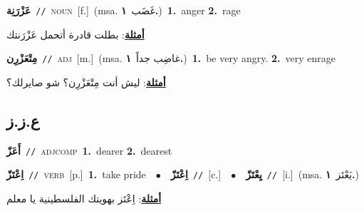 \documentclass[10pt,a4paper,twoside]{article} %
\begin{document}
\begin{multicols}{2}
{\setlength\topsep{0pt}\textbf{\foreignlanguage{arabic}{عَزْرَنِة}}\ {\color{gray}\texttt{//}\color{black}}\ \textsc{noun}\ [f.]\ \color{gray}(msa. \foreignlanguage{arabic}{غَضَب}~\foreignlanguage{arabic}{\textbf{١.}})\color{black}\ \textbf{1.}~anger  \textbf{2.}~rage\  \begin{flushright}\color{gray}\foreignlanguage{arabic}{\textbf{\underline{\foreignlanguage{arabic}{أمثلة}}}: بطلت قادرة أتحمل عَزْرَنتك}\end{flushright}\color{black}} \vspace{2mm}

{\setlength\topsep{0pt}\textbf{\foreignlanguage{arabic}{مِتْعَزْرِن}}\ {\color{gray}\texttt{//}\color{black}}\ \textsc{adj}\ [m.]\ \color{gray}(msa. \foreignlanguage{arabic}{غاضِب جداً}~\foreignlanguage{arabic}{\textbf{١.}})\color{black}\ \textbf{1.}~be very angry.  \textbf{2.}~very enrage\  \begin{flushright}\color{gray}\foreignlanguage{arabic}{\textbf{\underline{\foreignlanguage{arabic}{أمثلة}}}: ليش أنت مِتْعَزْرِن؟ شو صايرلك؟}\end{flushright}\color{black}} \vspace{2mm}

\vspace{-3mm}
\subsection*{\color{blue}\foreignlanguage{arabic}{ع.ز.ز}\color{blue}{}} 

{\setlength\topsep{0pt}\textbf{\foreignlanguage{arabic}{أَعَزّ}}\ {\color{gray}\texttt{//}\color{black}}\ \textsc{adj\textunderscore comp}\ \textbf{1.}~dearer  \textbf{2.}~dearest\ } \vspace{2mm}

{\setlength\topsep{0pt}\textbf{\foreignlanguage{arabic}{اِعْتَزّ}}\ {\color{gray}\texttt{//}\color{black}}\ \textsc{verb}\ [p.]\ \textbf{1.}~take pride\ \ $\bullet$\ \ \setlength\topsep{0pt}\textbf{\foreignlanguage{arabic}{اِعْتَزّ}}\ {\color{gray}\texttt{//}\color{black}}\ [c.]\ \ $\bullet$\ \ \setlength\topsep{0pt}\textbf{\foreignlanguage{arabic}{يِعْتَزّ}}\ {\color{gray}\texttt{//}\color{black}}\ [i.]\ \color{gray}(msa. \foreignlanguage{arabic}{يَعْتَز}~\foreignlanguage{arabic}{\textbf{١.}})\color{black}\  \begin{flushright}\color{gray}\foreignlanguage{arabic}{\textbf{\underline{\foreignlanguage{arabic}{أمثلة}}}: اِعْتَز بهويتك الفلسطينية يا معلم}\end{flushright}\color{black}} \vspace{2mm}


\end{multicols}
\end{document}
